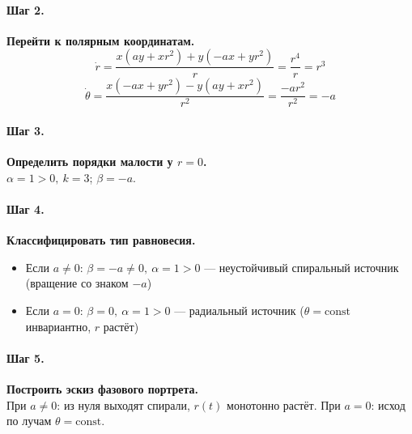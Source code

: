 \paragraph{Шаг 2.} \textbf{Перейти к полярным координатам.}\\
\[
\dot r=\frac{x(ay+xr^{2})+y(-ax+yr^{2})}{r}=\frac{r^{4}}{r}=r^{3}
\]
\[
\dot\theta=\frac{x(-ax+yr^{2})-y(ay+xr^{2})}{r^{2}}=\frac{-ar^{2}}{r^{2}}=-a
\]

\paragraph{Шаг 3.} \textbf{Определить порядки малости у \(r=0\).}\\
\(\alpha=1>0,\ k=3\); \(\beta=-a\).

\paragraph{Шаг 4.} \textbf{Классифицировать тип равновесия.}\\
\begin{itemize}
\item Если \(a\ne 0\): \(\beta=-a\ne 0,\ \alpha=1>0\) — неустойчивый спиральный источник (вращение со знаком \(-a\))
\item Если \(a=0\): \(\beta=0,\ \alpha=1>0\) — радиальный источник (\(\theta=\mathrm{const}\) инвариантно, \(r\) растёт)
\end{itemize}

\paragraph{Шаг 5.} \textbf{Построить эскиз фазового портрета.}\\
При \(a\ne 0\): из нуля выходят спирали, \(r(t)\) монотонно растёт. При \(a=0\): исход по лучам \(\theta=\mathrm{const}\).


